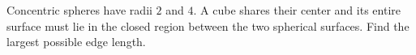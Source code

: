 Concentric spheres have radii $2$ and $4$. A cube shares their center and its entire surface must lie in the closed region between the two spherical surfaces. Find the largest possible edge length.
